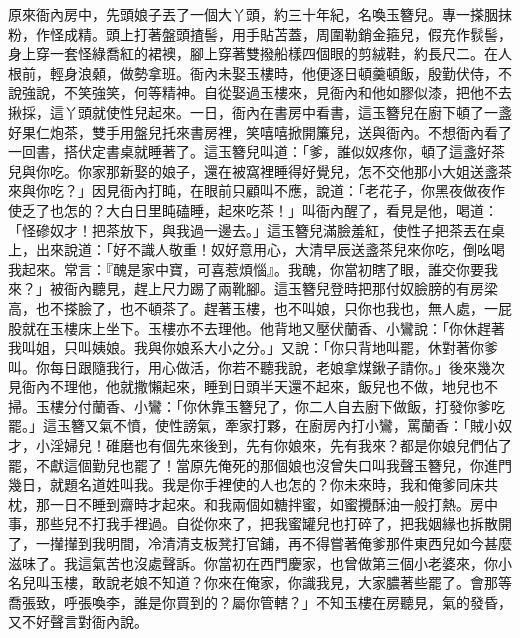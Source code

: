 原來衙內房中，先頭娘子丟了一個大丫頭，約三十年紀，名喚玉簪兒。專一搽胭抹粉，作怪成精。頭上打著盤頭揸髻，用手貼苫蓋，周圍勒銷金箍兒，假充作䯼髻，身上穿一套怪綠喬紅的裙襖，腳上穿著雙撥船樣四個眼的剪絨鞋，約長尺二。在人根前，輕身浪顙，做勢拿班。衙內未娶玉樓時，他便逐日頓羹頓飯，殷勤伏侍，不說強說，不笑強笑，何等精神。自從娶過玉樓來，見衙內和他如膠似漆，把他不去揪採，這丫頭就使性兒起來。一日，衙內在書房中看書，這玉簪兒在廚下頓了一盞好果仁炮茶，雙手用盤兒托來書房裡，笑嘻嘻掀開簾兒，送與衙內。不想衙內看了一回書，搭伏定書桌就睡著了。這玉簪兒叫道：「爹，誰似奴疼你，頓了這盞好茶兒與你吃。你家那新娶的娘子，還在被窩裡睡得好覺兒，怎不交他那小大姐送盞茶來與你吃？」因見衙內打盹，在眼前只顧叫不應，說道：「老花子，你黑夜做夜作使乏了也怎的？大白日里盹磕睡，起來吃茶！」叫衙內醒了，看見是他，喝道：「怪磣奴才！把茶放下，與我過一邊去。」這玉簪兒滿臉羞紅，使性子把茶丟在桌上，出來說道：「好不識人敬重！奴好意用心，大清早辰送盞茶兒來你吃，倒吆喝我起來。常言：『醜是家中寶，可喜惹煩惱』。我醜，你當初瞎了眼，誰交你要我來？」被衙內聽見，趕上尺力踢了兩靴腳。這玉簪兒登時把那付奴臉膀的有房梁高，也不搽臉了，也不頓茶了。趕著玉樓，也不叫娘，只你也我也，無人處，一屁股就在玉樓床上坐下。玉樓亦不去理他。他背地又壓伏蘭香、小鸞說：「你休趕著我叫姐，只叫姨娘。我與你娘系大小之分。」又說：「你只背地叫罷，休對著你爹叫。你每日跟隨我行，用心做活，你若不聽我說，老娘拿煤鍬子請你。」後來幾次見衙內不理他，他就撒懶起來，睡到日頭半天還不起來，飯兒也不做，地兒也不掃。玉樓分付蘭香、小鸞：「你休靠玉簪兒了，你二人自去廚下做飯，打發你爹吃罷。」這玉簪又氣不憤，使性謗氣，牽家打夥，在廚房內打小鸞，罵蘭香：「賊小奴才，小淫婦兒！碓磨也有個先來後到，先有你娘來，先有我來？都是你娘兒們佔了罷，不獻這個勤兒也罷了！當原先俺死的那個娘也沒曾失口叫我聲玉簪兒，你進門幾日，就題名道姓叫我。我是你手裡使的人也怎的？你未來時，我和俺爹同床共枕，那一日不睡到齋時才起來。和我兩個如糖拌蜜，如蜜攪酥油一般打熱。房中事，那些兒不打我手裡過。自從你來了，把我蜜罐兒也打碎了，把我姻緣也拆散開了，一攆攆到我明間，冷清清支板凳打官鋪，再不得嘗著俺爹那件東西兒如今甚麼滋味了。我這氣苦也沒處聲訴。你當初在西門慶家，也曾做第三個小老婆來，你小名兒叫玉樓，敢說老娘不知道？你來在俺家，你識我見，大家膿著些罷了。會那等喬張致，呼張喚李，誰是你買到的？屬你管轄？」不知玉樓在房聽見，氣的發昏，又不好聲言對衙內說。

